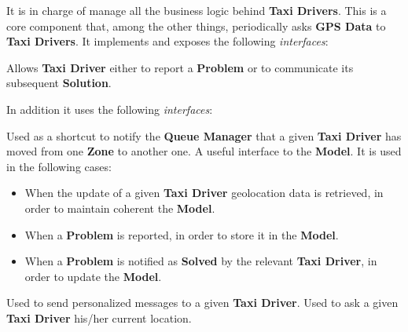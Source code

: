 \begin{itemize}
\begin{itemize}
		 It is in charge of manage all the business logic behind \textbf{Taxi Drivers}.
		This is a core component that, among the other things, periodically asks \textbf{GPS Data} to \textbf{Taxi Drivers}.
		It implements and exposes the following \textit{interfaces}:
		\begin{itemize}
			 Allows \textbf{Taxi Driver} either to report a \textbf{Problem} or to communicate its subsequent \textbf{Solution}.
		\end{itemize}
		In addition it uses the following \textit{interfaces}:
		\begin{itemize}
			 Used as a shortcut to notify the \textbf{Queue Manager} that a given \textbf{Taxi Driver} has moved from one \textbf{Zone} to another one.
			 A useful interface to the \textbf{Model}.
			It is used in the following cases:
			\begin{itemize}
				\item When the update of a given \textbf{Taxi Driver} geolocation data is retrieved, in order to maintain coherent the \textbf{Model}.
				\item When a \textbf{Problem} is reported, in order to store it in the \textbf{Model}.
				\item When a \textbf{Problem} is notified as \textbf{Solved} by the relevant \textbf{Taxi Driver}, in order to update the \textbf{Model}.
			\end{itemize}
			 Used to send personalized messages to a given \textbf{Taxi Driver}.
			 Used to ask a given \textbf{Taxi Driver} his/her current location.
		\end{itemize}
		

\end{itemize}
\end{itemize}
